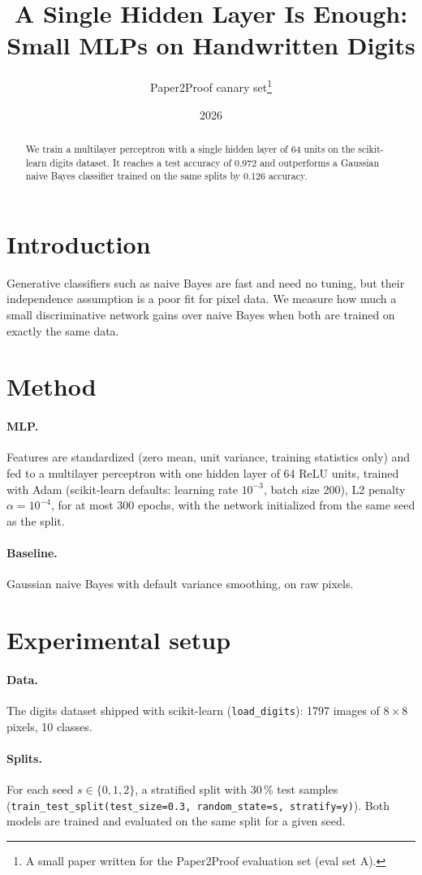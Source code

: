\documentclass[11pt]{article}
\title{A Single Hidden Layer Is Enough: Small MLPs on Handwritten Digits}
\author{Paper2Proof canary set\thanks{A small paper written for the Paper2Proof evaluation set (eval set A).}}
\date{2026}
\begin{document}
\maketitle

\begin{abstract}
We train a multilayer perceptron with a single hidden layer of 64 units on the scikit-learn
digits dataset. It reaches a test accuracy of 0.972 and outperforms a Gaussian naive Bayes
classifier trained on the same splits by 0.126 accuracy.
\end{abstract}

\section{Introduction}
Generative classifiers such as naive Bayes are fast and need no tuning, but their independence
assumption is a poor fit for pixel data. We measure how much a small discriminative network gains
over naive Bayes when both are trained on exactly the same data.

\section{Method}
\paragraph{MLP.} Features are standardized (zero mean, unit variance, training statistics only)
and fed to a multilayer perceptron with one hidden layer of 64 ReLU units, trained with Adam
(scikit-learn defaults: learning rate $10^{-3}$, batch size 200), L2 penalty $\alpha = 10^{-4}$,
for at most 300 epochs, with the network initialized from the same seed as the split.
\paragraph{Baseline.} Gaussian naive Bayes with default variance smoothing, on raw pixels.

\section{Experimental setup}
\paragraph{Data.} The digits dataset shipped with scikit-learn (\texttt{load\_digits}): 1797
images of $8 \times 8$ pixels, 10 classes.
\paragraph{Splits.} For each seed $s \in \{0, 1, 2\}$, a stratified split with 30\,\% test
samples (\texttt{train\_test\_split(test\_size=0.3, random\_state=s, stratify=y)}). Both models
are trained and evaluated on the same split for a given seed.
\end{document}
